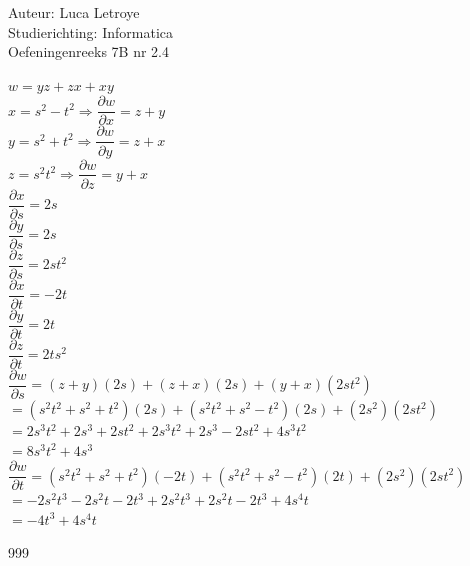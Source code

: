 \documentclass[a4paper]{article}
\begin{document}
  
\noindent \large Auteur: Luca Letroye \\
\noindent \large Studierichting: Informatica\\
\noindent \large Oefeningenreeks 7B nr 2.4\\

\medskip

\normalsize

$w = yz+zx+xy$\\

$x = s^2-t^2 \Rightarrow \dfrac{\partial w}{\partial x} = z+y$\\

$y = s^2+t^2 \Rightarrow \dfrac{\partial w}{\partial y} = z+x$\\

$z = s^2t^2 \Rightarrow \dfrac{\partial w}{\partial z} = y+x$\\

$\dfrac{\partial x}{\partial s} = 2s$\\

$\dfrac{\partial y}{\partial s} = 2s$\\

$\dfrac{\partial z}{\partial s} = 2st^2$\\

$\dfrac{\partial x}{\partial t} = -2t$\\

$\dfrac{\partial y}{\partial t} = 2t$\\

$\dfrac{\partial z}{\partial t} = 2ts^2$\\

$\dfrac{\partial w}{\partial s} = (z+y)(2s)+(z+x)(2s)+(y+x)(2st^2)$\\

$ = (s^2t^2+s^2+t^2)(2s)+(s^2t^2+s^2-t^2)(2s)+(2s^2)(2st^2)$\\

$ = 2s^3t^2+2s^3+2st^2+2s^3t^2+2s^3-2st^2+4s^3t^2$\\

$= 8s^3t^2+4s^3$\\

$\dfrac{\partial w}{\partial t} = (s^2t^2+s^2+t^2)(-2t)+(s^2t^2+s^2-t^2)(2t)+(2s^2)(2st^2)$\\

$= -2s^2t^3-2s^2t-2t^3+2s^2t^3+2s^2t-2t^3+4s^4t$\\

$= -4t^3+4s^4t$\\


\begin{thebibliography}{999}
\end{thebibliography}
\end{document}
